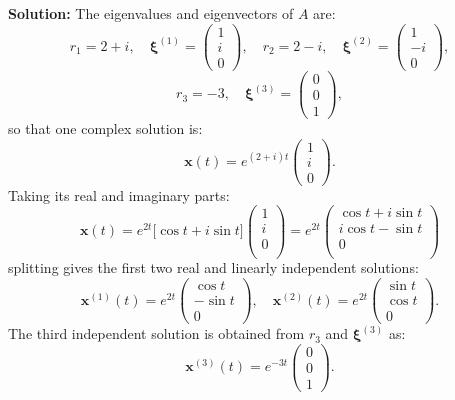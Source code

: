 \documentclass[10pt,landscape]{article}
\begin{document}
\begin{multicols}{2}
    \textbf{Solution:} The eigenvalues and eigenvectors of \(A\) are:\\
\[
r_1 = 2 + i, \quad \mathbf{\boldsymbol{\xi}}^{(1)} =
\begin{pmatrix}
1 \\
i \\
0
\end{pmatrix}, \quad
r_2 = 2 - i, \quad \mathbf{\boldsymbol{\xi}}^{(2)} =
\begin{pmatrix}
1 \\
-i \\
0
\end{pmatrix}, \]\[
r_3 = -3, \quad \mathbf{\boldsymbol{\xi}}^{(3)} =
\begin{pmatrix}
0 \\
0 \\
1
\end{pmatrix},
\]
so that one complex solution is:\\
\[
\mathbf{x}(t) = e^{(2+i)t}
\begin{pmatrix}
1 \\
i \\
0
\end{pmatrix}.
\]
Taking its real and imaginary parts:\\

$$\mathbf{x}(t) = e^{2t}\big[\cos t+i\sin t\big]\begin{pmatrix}
    1\\
    i\\
    0\\
\end{pmatrix} = e^{2t}\begin{pmatrix}
    \cos t + i\sin t\\
    i\cos t - \sin t\\
    0\\
\end{pmatrix}$$
splitting gives the first two real and linearly independent solutions:\\
\[
\mathbf{x}^{(1)}(t) = e^{2t}
\begin{pmatrix}
\cos t \\
-\sin t \\
0
\end{pmatrix}, \quad
\mathbf{x}^{(2)}(t) = e^{2t}
\begin{pmatrix}
\sin t \\
\cos t \\
0
\end{pmatrix}.
\]
The third independent solution is obtained from \(r_3\) and \(\mathbf{\boldsymbol{\xi}}^{(3)}\) as:\\
\[
\mathbf{x}^{(3)}(t) = e^{-3t}
\begin{pmatrix}
0 \\
0 \\
1
\end{pmatrix}.
\]



\end{multicols}
\end{document}
